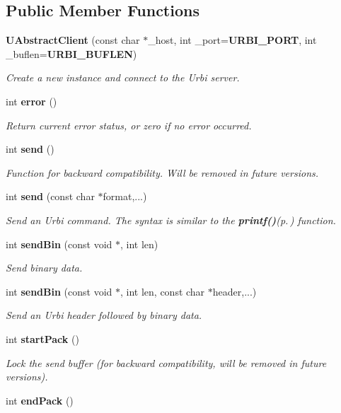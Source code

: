 \subsection*{Public Member Functions}
\begin{CompactItemize}
\item 
{\bf UAbstract\-Client} (const char $\ast$\_\-host, int \_\-port={\bf URBI\_\-PORT}, int \_\-buflen={\bf URBI\_\-BUFLEN})
\begin{CompactList}\small\item\em Create a new instance and connect to the Urbi server. \item\end{CompactList}\item 
int {\bf error} ()\label{classUAbstractClient_a2}

\begin{CompactList}\small\item\em Return current error status, or zero if no error occurred. \item\end{CompactList}\item 
int {\bf send} ()\label{classUAbstractClient_a3}

\begin{CompactList}\small\item\em Function for backward compatibility. Will be removed in future versions. \item\end{CompactList}\item 
int {\bf send} (const char $\ast$format,...)
\begin{CompactList}\small\item\em Send an Urbi command. The syntax is similar to the {\bf printf()}{\rm (p.\,\pageref{classUAbstractClient_a31})} function. \item\end{CompactList}\item 
int {\bf send\-Bin} (const void $\ast$, int len)\label{classUAbstractClient_a5}

\begin{CompactList}\small\item\em Send binary data. \item\end{CompactList}\item 
int {\bf send\-Bin} (const void $\ast$, int len, const char $\ast$header,...)\label{classUAbstractClient_a6}

\begin{CompactList}\small\item\em Send an Urbi header followed by binary data. \item\end{CompactList}\item 
int {\bf start\-Pack} ()
\begin{CompactList}\small\item\em Lock the send buffer (for backward compatibility, will be removed in future versions). \item\end{CompactList}\item 
int {\bf end\-Pack} ()\label{classUAbstractClient_a8}


\end{CompactItemize}
